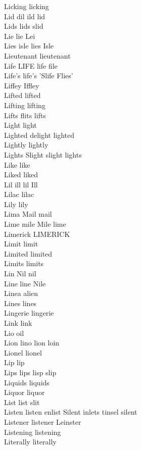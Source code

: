 Licking licking\\
Lid dil ild lid\\
Lids lids slid\\
Lie lie Lei\\
Lies isle lies Isle\\
Lieutenant lieutenant\\
Life LIFE life file\\
Life's life's 'Slife Flies'\\
Liffey Iffley\\
Lifted lifted\\
Lifting lifting\\
Lifts flits lifts\\
Light light\\
Lighted delight lighted\\
Lightly lightly\\
Lights Slight slight lights\\
Like like\\
Liked liked\\
Lil ill lil Ill\\
Lilac lilac\\
Lily lily\\
Lima Mail mail\\
Lime mile Mile lime\\
Limerick LIMERICK\\
Limit limit\\
Limited limited\\
Limits limits\\
Lin Nil nil\\
Line line Nile\\
Linea alien\\
Lines lines\\
Lingerie lingerie\\
Link link\\
Lio oil\\
Lion lino lion loin\\
Lionel lionel\\
Lip lip\\
Lips lips lisp slip\\
Liquids liquids\\
Liquor liquor\\
List list slit\\
Listen listen enlist Silent inlets tinsel silent\\
Listener listener Leinster\\
Listening listening\\
Literally literally\\
